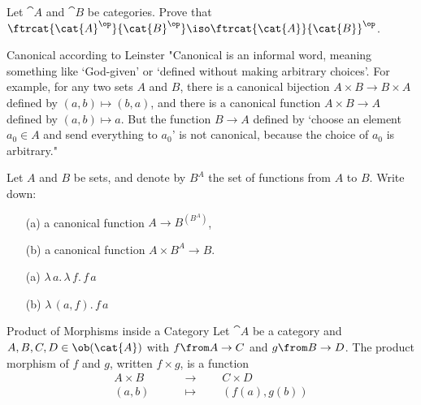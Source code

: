\begin{exercise}
        Let $\cat{A}$ and $\cat{B}$ be categories. Prove that
        $\ftrcat{\cat{A}^\op}{\cat{B}^\op} \iso \ftrcat{\cat{A}}{\cat{B}}^\op$.
\end{exercise}

\begin{definition}{Canonical according to Leinster}
  "Canonical is an informal word, meaning something like `God-given' or
  `defined without making arbitrary choices'.  For example, for any two sets
  $A$ and $B$, there is a canonical bijection $A \times B \to B \times A$
  defined by $(a, b) \mapsto (b, a)$, and there is a canonical function $A
  \times B \to A$ defined by $(a, b) \mapsto a$.  But the function $B \to A$
  defined by `choose an element $a_0 \in A$ and send everything to $a_0$' is
  not canonical, because the choice of $a_0$ is arbitrary."
\end{definition}

\begin{exercise}
  Let $A$ and $B$ be sets, and denote by $B^A$ the set of functions from $A$
  to $B$.  Write down:
  \begin{itemize}
  \item[(a)] a canonical function $A \to B^{(B^A)}$,
  \item[(b)] a canonical function $A \times B^{A} \to B$.
  \end{itemize}
\end{exercise}
\begin{answer}
    \begin{itemize}
        \item[(a)] $\lambda\, a.\, \lambda\,f.\, f\,a$
        \item[(b)] $\lambda\, (a, f).\, f\,a$
    \end{itemize}
\end{answer}

\begin{definition}{Product of Morphisms inside a Category}
  Let $\cat{A}$ be a category and $A, B, C, D \in \ob(\cat{A})$ with $f \from A \to C$ and $g \from B \to D$.
  The product morphism of $f$ and $g$, written $f \times g$, is a function
  \begin{align*}
    A \times B &\qquad\to\qquad C \times D\\
    (a, b) &\qquad\mapsto\qquad (f(a), g(b))
  \end{align*}
\end{definition}

\newcommand{\eval}[1]{\ensuremath{\mathsf{eval}^{#1}\xspace}}

